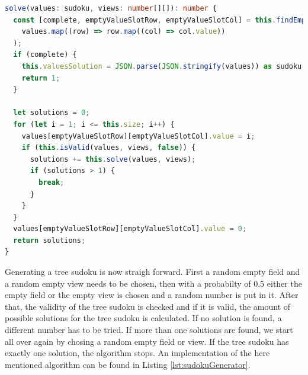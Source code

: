 \begin{lstlisting}[language=TypeScript,caption={Solving algorithm for a tree sudoku instance},label={lst:sudokuSolver}]
solve(values: sudoku, views: number[][]): number {
  const [complete, emptyValueSlotRow, emptyValueSlotCol] = this.findEmptySlot(
    values.map((row) => row.map((col) => col.value))
  );
  if (complete) {
    this.valuesSolution = JSON.parse(JSON.stringify(values)) as sudoku; // deep copy
    return 1;
  }

  let solutions = 0;
  for (let i = 1; i <= this.size; i++) {
    values[emptyValueSlotRow][emptyValueSlotCol].value = i;
    if (this.isValid(values, views, false)) {
      solutions += this.solve(values, views);
      if (solutions > 1) {
        break;
      }
    }
  }
  values[emptyValueSlotRow][emptyValueSlotCol].value = 0;
  return solutions;
}
\end{lstlisting}

Generating a tree sudoku is now straigh forward. First a random empty field and a random empty view needs to be chosen, then with a probabilty of 0.5 either the empty field or the empty view is chosen and a random number is put in it. After that, the validity of the tree sudoku is checked and if it is valid, the amount of possible solutions for the tree sudoku is calculated. If no solution is found, a different number has to be tried. If more than one solutions are found, we start all over again by chosing a random empty field or view. If the tree sudoku has exactly one solution, the algorithm stops. An implementation of the here mentioned algorithm can be found in Listing \ref{lst:sudokuGenerator}.

